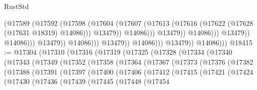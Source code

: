 \begin{lexlean}{RustStd}
\begin{coremodule}
                                                    (@17589
                                                      (@17592
                                                        (@17598
                                                          (@17604
                                                            (@17607
                                                              (@17613
                                                                (@17616
                                                                  (@17622
                                                                    (@17628
                                                                      (@17631 @18319)
                                                                      @14086)))
                                                                @13479))
                                                            @14086)))
                                                      @13479))
                                                  @14086)))
                                            @13479))
                                        @14086)))
                                  @13479))
                              @14086)))
                        @13479))
                    @14086)))
              @13479))
          @14086)))
@18415 := @17304
    (@17310
      (@17316
        (@17319
          (@17325
            (@17328
              (@17334
                (@17340
                  (@17343
                    (@17349
                      (@17352
                        (@17358
                          (@17364
                            (@17367
                              (@17373
                                (@17376
                                  (@17382
                                    (@17388
                                      (@17391
                                        (@17397
                                          (@17400
                                            (@17406
                                              (@17412
                                                (@17415
                                                  (@17421
                                                    (@17424
                                                      (@17430
                                                        (@17436
                                                          (@17439
                                                            (@17445
                                                              (@17448
                                                                (@17454

\end{coremodule}
\end{lexlean}
